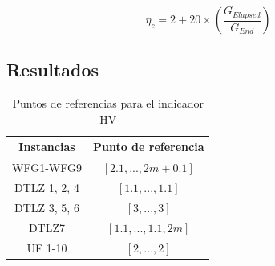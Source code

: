 \begin{equation}\label{eqn:index_eta}
 \eta_c = 2 + 20 \times \left ( \frac{G_{Elapsed}}{G_{End}} \right)
\end{equation}

\subsection{Resultados}

\begin{table}[t]
\centering
\scriptsize
\caption{Puntos de referencias para el indicador HV}
\label{tab:ReferencePoints}
\begin{tabular}{cc}
\hline
\textbf{Instancias} & \textbf{Punto de referencia} \\ \hline
WFG1-WFG9 & $[2.1, ...,2m+0.1]$ \\
DTLZ 1, 2, 4 & $[1.1, ..., 1.1]$ \\
DTLZ 3, 5, 6 & $[3, ..., 3]$ \\
DTLZ7 & $[1.1, ..., 1.1, 2m]$ \\
UF 1-10 & $[2, ..., 2]$ \\ \hline
\end{tabular}
\end{table}


